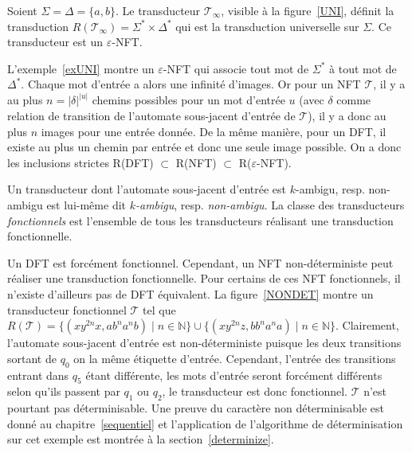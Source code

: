 	\begin{example}
	    Soient $\Sigma = \Delta = \{a,b\}$. Le transducteur $\mathscr{T}_\infty$, visible à la figure~\ref{UNI}, définit la transduction $R(\mathscr{T}_\infty) = \Sigma^* \times \Delta^*$ qui est la transduction universelle sur $\Sigma$. Ce transducteur est un $\varepsilon$-NFT.
	\label{exUNI}
	\end{example}
    
    
    
    L'exemple~\ref{exUNI} montre un $\varepsilon$-NFT qui associe tout mot de $\Sigma^*$ à tout mot de $\Delta^*$. Chaque mot d'entrée a alors une infinité d'images. Or pour un NFT $\mathscr{T}$, il y a au plus $n = |\delta|^{|u|}$ chemins possibles pour un mot d'entrée $u$ (avec $\delta$ comme relation de transition de l'automate sous-jacent d'entrée de $\mathscr{T}$), il y a donc au plus $n$ images pour une entrée donnée. De la même manière, pour un DFT, il existe au plus un chemin par entrée et donc une seule image possible. On a donc les inclusions strictes R(DFT) $\subset$ R(NFT) $\subset$ R($\varepsilon$-NFT).

    Un transducteur dont l'automate sous-jacent d'entrée est $k$-ambigu, resp. non-ambigu est lui-même dit \emph{$k$-ambigu}, resp. \emph{non-ambigu}. La classe des transducteurs \emph{fonctionnels} est l'ensemble de tous les transducteurs réalisant une transduction fonctionnelle.
    
    Un DFT est forcément fonctionnel. Cependant, un NFT non-déterministe peut réaliser une transduction fonctionnelle. Pour certains de ces NFT fonctionnels, il n'existe d'ailleurs pas de DFT équivalent. La figure~\ref{NONDET} montre un transducteur fonctionnel $\mathscr{T}$ tel que $R(\mathscr{T}) = \{(xy^{2n}x,ab^na^nb) \mid n \in \mathbb{N}\} \cup \{(xy^{2n}z,bb^na^na) \mid n \in \mathbb{N}\}$. Clairement, l'automate sous-jacent d'entrée est non-déterministe puisque les deux transitions sortant de $q_0$ on la même étiquette d'entrée. Cependant, l'entrée des transitions entrant dans $q_5$ étant différente, les mots d'entrée seront forcément différents selon qu'ils passent par $q_1$ ou $q_2$, le transducteur est donc fonctionnel. $\mathscr{T}$ n'est pourtant pas déterminisable. Une preuve du caractère non déterminisable est donné au chapitre~\ref{sequentiel} et l'application de l'algorithme de déterminisation sur cet exemple est montrée à la section~\ref{determinize}.
    
    
    
